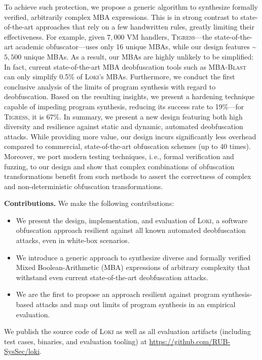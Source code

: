 \documentclass[letterpaper,twocolumn,10pt]{article}
\newcommand{\ie}{i.\,e.,\xspace}
\theoremstyle{customexample}
\theoremstyle{customexperiment}
\newcommand{\loki}{\textsc{Loki}\xspace}
\newcommand{\mbablast}{\textsc{MBA-Blast}\xspace}
\newcommand{\tigress}{\textsc{Tigress}\xspace}
\begin{document}
To achieve such protection, we propose a generic algorithm to synthesize formally verified, arbitrarily complex MBA expressions. This is in strong contrast to state-of-the-art approaches that rely on a few handwritten rules, greatly limiting their effectiveness. For example, given $7,000$ VM handlers, \tigress---the state-of-the-art academic obfuscator---uses only 16 unique MBAs, while our design features \textasciitilde$5,500$ unique MBAs. As a result, our MBAs are highly unlikely to be simplified: In fact, current state-of-the-art MBA deobfuscation tools such as \mbablast~\cite{liu2021mbablast} can only simplify 0.5\% of \loki's MBAs.
Furthermore, we conduct the first conclusive analysis of the limits of program synthesis with regard to deobfuscation. Based on the resulting insights, we present a hardening technique capable of impeding program synthesis, reducing its success rate to 19\%---for \tigress, it is 67\%.
In summary, we present a new design featuring both high diversity and resilience against static and dynamic, automated deobfuscation attacks. While providing more value, our design incurs significantly less overhead compared to commercial, state-of-the-art obfuscation schemes (up to 40 times).
Moreover, we port modern testing techniques, \ie formal verification and fuzzing, to our design and show that complex combinations of obfuscation transformations benefit from such methods to assert the correctness of complex and non-deterministic obfuscation transformations.

\smallskip
\noindent
\textbf{Contributions.} We make the following contributions:
 \begin{itemize}
\item We present the design, implementation, and evaluation of \loki, a software obfuscation approach resilient against all known automated deobfuscation attacks, even in white-box scenarios. \item We introduce a generic approach to synthesize diverse and formally verified Mixed Boolean-Arithmetic (MBA) expressions of arbitrary complexity that withstand even current state-of-the-art deobfuscation attacks.
\item We are the first to propose an approach resilient against program synthesis-based attacks and map out limits of program synthesis in an empirical evaluation.
 \end{itemize}


\noindent We publish the source code of \loki as well as all evaluation artifacts (including test cases, binaries, and evaluation tooling) at \url{https://github.com/RUB-SysSec/loki}.
\end{document}
